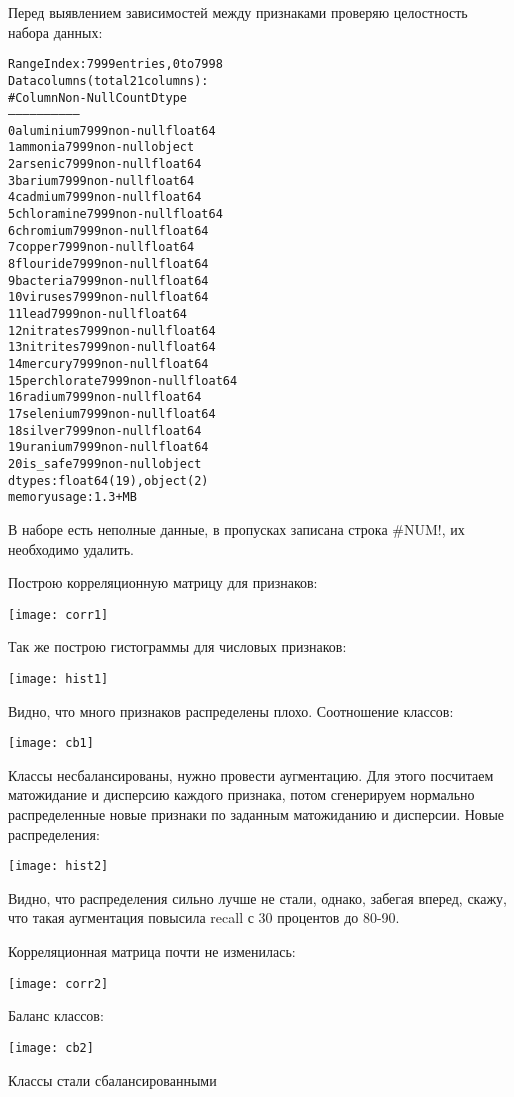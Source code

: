 Перед выявлением зависимостей между признаками проверяю целостность набора данных:
\begin{alltt}
RangeIndex: 7999 entries, 0 to 7998
Data columns (total 21 columns):
 #   Column       Non-Null Count  Dtype  
---  ------       --------------  -----  
 0   aluminium    7999 non-null   float64
 1   ammonia      7999 non-null   object 
 2   arsenic      7999 non-null   float64
 3   barium       7999 non-null   float64
 4   cadmium      7999 non-null   float64
 5   chloramine   7999 non-null   float64
 6   chromium     7999 non-null   float64
 7   copper       7999 non-null   float64
 8   flouride     7999 non-null   float64
 9   bacteria     7999 non-null   float64
 10  viruses      7999 non-null   float64
 11  lead         7999 non-null   float64
 12  nitrates     7999 non-null   float64
 13  nitrites     7999 non-null   float64
 14  mercury      7999 non-null   float64
 15  perchlorate  7999 non-null   float64
 16  radium       7999 non-null   float64
 17  selenium     7999 non-null   float64
 18  silver       7999 non-null   float64
 19  uranium      7999 non-null   float64
 20  is_safe      7999 non-null   object 
dtypes: float64(19), object(2)
memory usage: 1.3+ MB
\end{alltt}

В наборе есть неполные данные, в пропусках записана строка #NUM!, их необходимо удалить.
\pagebreak

Построю корреляционную матрицу для признаков:
\begin{center}
\texttt{[image: corr1]}
\end{center}
Так же построю гистограммы для числовых признаков:
\begin{center}
\texttt{[image: hist1]}
\end{center}
Видно, что много признаков распределены плохо. Соотношение классов:
\begin{center}
\texttt{[image: cb1]}
\end{center}
Классы несбалансированы, нужно провести аугментацию. Для этого посчитаем матожидание и дисперсию каждого признака, потом сгенерируем нормально распределенные новые признаки по заданным матожиданию и дисперсии.
\pagebreak
Новые распределения:
\begin{center}
\texttt{[image: hist2]}
\end{center}
Видно, что распределения сильно лучше не стали, однако, забегая вперед, скажу, что такая аугментация повысила recall с 30 процентов до 80-90.
\pagebreak

Корреляционная матрица почти не изменилась:
\begin{center}
\texttt{[image: corr2]}
\end{center}

Баланс классов:
\begin{center}
\texttt{[image: cb2]}
\end{center}
Классы стали сбалансированными

\pagebreak
